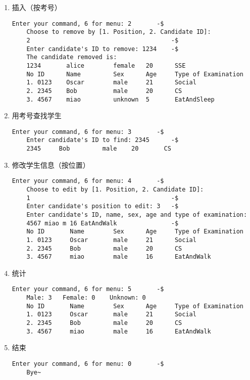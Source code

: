 \begin{enumerate}
    \item 插入（按考号）
\begin{lstlisting}[style=console]
    Enter your command, 6 for menu: 2       -$
    Choose to remove by [1. Position, 2. Candidate ID]: 
    2                                       -$
    Enter candidate's ID to remove: 1234    -$
    The candidate removed is: 
    1234       alice        female   20      SSE
    No ID      Name         Sex      Age     Type of Examination
    1. 0123    Oscar        male     21      Social
    2. 2345    Bob          male     20      CS
    3. 4567    miao         unknown  5       EatAndSleep
\end{lstlisting}

    \item 用考号查找学生
\begin{lstlisting}[style=console]
    Enter your command, 6 for menu: 3       -$
    Enter candidate's ID to find: 2345      -$
    2345     Bob         male    20       CS
\end{lstlisting}

    \item 修改学生信息（按位置）
\begin{lstlisting}[style=console]
    Enter your command, 6 for menu: 4       -$
    Choose to edit by [1. Position, 2. Candidate ID]: 
    1                                       -$
    Enter candidate's position to edit: 3   -$
    Enter candidate's ID, name, sex, age and type of examination: 
    4567 miao m 16 EatAndWalk               -$
    No ID       Name        Sex      Age     Type of Examination
    1. 0123     Oscar       male     21      Social
    2. 2345     Bob         male     20      CS
    3. 4567     miao        male     16      EatAndWalk
\end{lstlisting}

    \item 统计
\begin{lstlisting}[style=console]
    Enter your command, 6 for menu: 5       -$
    Male: 3   Female: 0    Unknown: 0
    No ID       Name        Sex      Age     Type of Examination
    1. 0123     Oscar       male     21      Social
    2. 2345     Bob         male     20      CS
    3. 4567     miao        male     16      EatAndWalk
\end{lstlisting}

    \item 结束
\begin{lstlisting}[style=console]
    Enter your command, 6 for menu: 0       -$
    Bye~
\end{lstlisting}
\end{enumerate}

